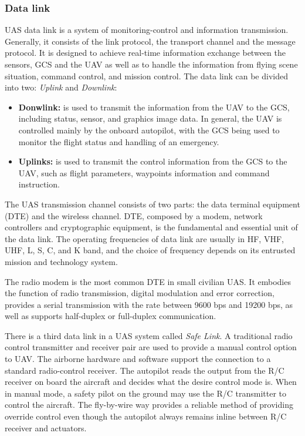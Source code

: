 \subsubsection{Data link}
UAS data link is a system of monitoring-control and information transmission. Generally, it consists of the link protocol, the transport channel and the message protocol. It is designed to achieve real-time information exchange between the sensors, GCS and the UAV as well as to handle the information from flying scene situation, command control, and mission control.\cite{6305636} The data link can be divided into two: \textit{Uplink} and \textit{Downlink}:

\begin{itemize}
    \item \textbf{Donwlink:}  is used to transmit the information from the UAV to the GCS, including status, sensor, and graphics image data. In general, the UAV is controlled mainly by the onboard autopilot, with the GCS being used to monitor the flight status and handling of an emergency. \cite{6305636}
    \item \textbf{Uplinks:} is used to transmit the control information from the GCS to the UAV, such as flight parameters, waypoints information and command instruction. \cite{6305636}
\end{itemize}

The UAS transmission channel consists of two parts: the data terminal equipment (DTE) and the wireless channel. DTE, composed by a modem, network controllers and cryptographic equipment, is the fundamental and essential unit of the data link. The operating frequencies of data link are usually in HF, VHF, UHF, L, S, C, and K band, and the choice of frequency depends on its entrusted mission and technology system.\cite{6305636}

The radio modem is the most common DTE in small civilian UAS. It embodies the function of radio transmission, digital modulation and error correction, provides a serial transmission with the rate between 9600 bps and 19200 bps, as well as supports half-duplex or full-duplex communication.\cite{6305636}

There is a third data link in a UAS system called \textit{Safe Link}. A traditional radio control transmitter and receiver pair are used to provide a manual control option to UAV. The airborne hardware and software support the connection to a standard radio-control receiver. The autopilot reads the output from the R/C receiver on board the aircraft and decides what the desire control mode is. When in manual mode, a safety pilot on the ground may use the R/C transmitter to control the aircraft. The fly-by-wire way provides a reliable method of providing override control even though the autopilot always remains inline between R/C receiver and actuators.\cite{Hattenberger2014UsingTP}

